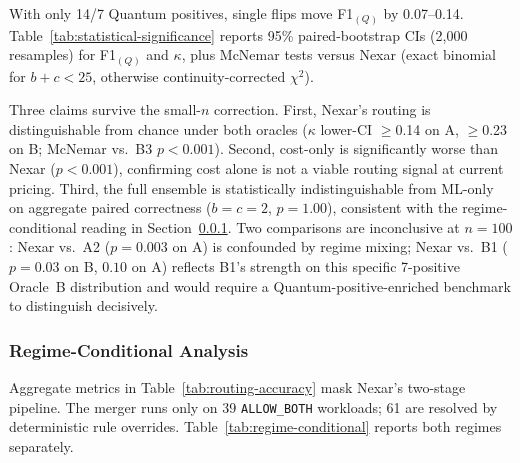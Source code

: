 \documentclass[10pt,conference]{IEEEtran}
\begin{document}
With only 14/7 Quantum positives, single flips move F1$_{(Q)}$ by 0.07--0.14. Table~\ref{tab:statistical-significance} reports 95\% paired-bootstrap CIs (2{,}000 resamples) for F1$_{(Q)}$ and $\kappa$, plus McNemar tests versus Nexar (exact binomial for $b{+}c{<}25$, otherwise continuity-corrected $\chi^{2}$).



Three claims survive the small-$n$ correction. First, Nexar's routing is distinguishable from chance under both oracles ($\kappa$ lower-CI $\geq$0.14 on A, $\geq$0.23 on B; McNemar vs.\ B3 $p{<}0.001$). Second, cost-only is significantly worse than Nexar ($p{<}0.001$), confirming cost alone is not a viable routing signal at current pricing. Third, the full ensemble is statistically indistinguishable from ML-only on aggregate paired correctness ($b{=}c{=}2$, $p{=}1.00$), consistent with the regime-conditional reading in Section~\ref{sec:regime-conditional}. Two comparisons are inconclusive at $n{=}100$: Nexar vs.\ A2 ($p{=}0.003$ on A) is confounded by regime mixing; Nexar vs.\ B1 ($p{=}0.03$ on B, $0.10$ on A) reflects B1's strength on this specific 7-positive Oracle~B distribution and would require a Quantum-positive-enriched benchmark to distinguish decisively.

\subsubsection{Regime-Conditional Analysis}\label{sec:regime-conditional}

Aggregate metrics in Table~\ref{tab:routing-accuracy} mask Nexar's two-stage pipeline. The merger runs only on 39 \texttt{ALLOW\_BOTH} workloads; 61 are resolved by deterministic rule overrides. Table~\ref{tab:regime-conditional} reports both regimes separately.
\end{document}
